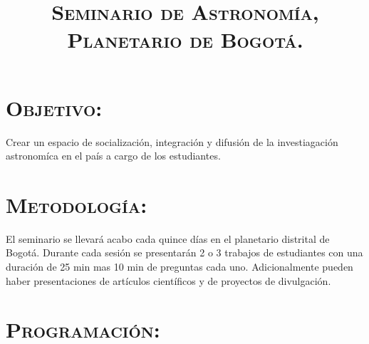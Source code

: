 \documentclass[12pt]{article}
\title{\textsc{Seminario de Astronom\'ia,\\ Planetario de Bogot\'a.}}
\begin{document}
\date{}
\maketitle

\section*{\textsc{Objetivo:}}
Crear un espacio de socializaci\'on, integraci\'on y difusi\'on de la investiagaci\'on astronom\'ica en el pa\'is
a cargo de los estudiantes.     

\section*{\textsc{Metodolog\'ia:}}
El seminario se llevar\'a acabo cada quince d\'ias en el planetario distrital de Bogot\'a.
Durante cada sesi\'on se presentar\'an 2 o 3 trabajos de estudiantes con una duraci\'on de 25 min mas 10 min de 
preguntas cada uno. Adicionalmente pueden haber presentaciones de art\'iculos cient\'ificos y de proyectos de divulgaci\'on.


\section*{\textsc{Programaci\'on:}}
\end{document}
